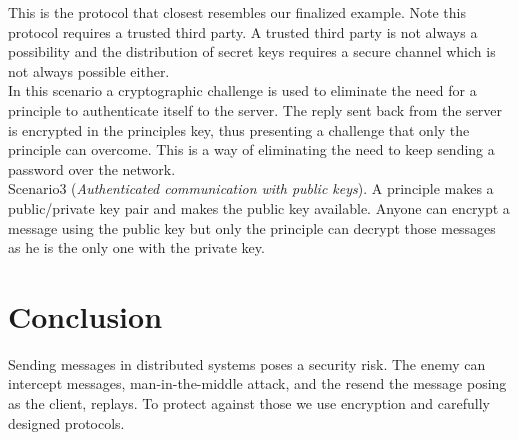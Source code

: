 This is the protocol that closest resembles our finalized example. Note this protocol requires a trusted third party. A trusted third party is not always a possibility and the distribution of secret keys requires a secure channel which is not always possible either. \\

In this scenario a cryptographic challenge is used to eliminate the need for a principle to authenticate itself to the server. The reply sent back from the server is encrypted in the principles key, thus presenting a challenge that only the principle can overcome. This is a way of eliminating the need to keep sending a password over the network.\\

Scenario3 (\textit{Authenticated communication with public keys}). A principle makes a public/private key pair and makes the public key available. Anyone can encrypt a message using the public key but only the principle can decrypt those messages as he is the only one with the private key. \\

 

  

\section{Conclusion}

Sending messages in distributed systems poses a security risk. The enemy can intercept messages, man-in-the-middle attack, and the resend the message posing as the client, replays. To protect against those we use encryption and carefully designed protocols. \\

